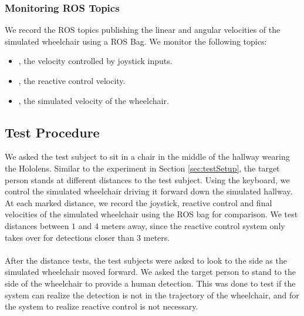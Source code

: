 \subsubsection{Monitoring ROS Topics}
We record the ROS topics publishing the linear and angular velocities of the simulated wheelchair using a ROS Bag. We monitor the following topics:

\begin{itemize}
	\item {}, the velocity controlled by joystick inputs.
	\item {}, the reactive control velocity.
	\item {}, the simulated velocity of the wheelchair.
\end{itemize}

\subsection{Test Procedure}
We asked the test subject to sit in a chair in the middle of the hallway wearing the Hololens. Similar to the experiment in Section \ref{sec:testSetup}, the target person stands at different distances to the test subject. Using the keyboard, we control the simulated wheelchair driving it forward down the simulated hallway. At each marked distance, we  record the joystick, reactive control and final velocities of the simulated wheelchair using the ROS bag for comparison. We test distances between $1$ and $4$ meters away, since the reactive control system only takes over for detections closer than $3$ meters. 

\paragraph{}After the distance tests, the test subjects were asked to look to the side as the simulated wheelchair moved forward. We asked the target person to stand to the side of the wheelchair to provide a human detection. This was done to test if the system can realize the detection is not in the trajectory of the wheelchair, and for the system to realize reactive control is not necessary.

